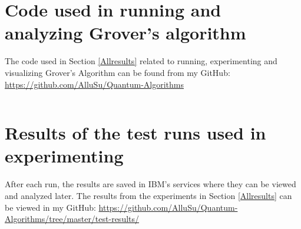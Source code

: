 \documentclass[english,oneside,openright]{UH_DS_report}
\begin{document}
\begin{appendices} 
\myappendixtitle

\chapter{Code used in running and analyzing Grover's algorithm} 
\label{appendix:code}

The code used in Section \ref{Allresults} related to running, experimenting and visualizing Grover's Algorithm can be found from my GitHub: \href{https://github.com/AlluSu/Quantum-Algorithms}{https://github.com/AlluSu/Quantum-Algorithms} 
\begin{verbatim}

\end{verbatim}

\chapter{Results of the test runs used in experimenting}
\label{appendix:testdataresults}
After each run, the results are saved in IBM's services where they can be viewed and analyzed later. The results from the experiments in Section \ref{Allresults} can be viewed in my GitHub:
\href{https://github.com/AlluSu/Quantum-Algorithms/tree/master/test-results/}{https://github.com/AlluSu/Quantum-Algorithms/tree/master/test-results/}

\end{appendices}
\end{document}
